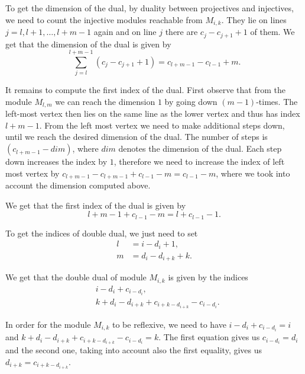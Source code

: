 \documentclass[12pt, a4paper]{article}
\numberwithin{equation}{section}
\theoremstyle{definition}
\theoremstyle{plain}
\theoremstyle{remark}
\begin{document}
To get the dimension of the dual, by duality between projectives and injectives, we need to count the injective modules reachable from $M_{i,k}$.
They lie on lines $j = l, l+1, \dots, l+m-1$ again and on line $j$ there are $c_j - c_{j+1} + 1$ of them.
We get that the dimension of the dual is given by
\begin{equation}
\label{eq:injectives}      
\sum_{j=l}^{l+m-1} (c_j - c_{j+1} + 1) = c_{l+m-1} - c_{l-1} + m.
\end{equation}

It remains to compute the first index of the dual.
First observe that from the module $M_{l,m}$ we can reach the dimension $1$ by going down $(m - 1)$-times. The left-most vertex then lies on the same line as the lower vertex and thus has index $l + m - 1$.
From the left most vertex we need to make additional steps down, until we reach the desired dimension of the dual.
The number of steps is $(c_{l+m-1} - dim)$, where $dim$ denotes the dimension of the dual.
Each step down increases the index by $1$, therefore we need to increase the index of left most vertex by $c_{l+m-1} - c_{l+m-1} + c_{l-1} - m = c_{l-1} - m$, where we took into account the dimension computed above.

We get that the first index of the dual is given by 
$$l + m - 1 + c_{l-1} - m = l + c_{l-1} - 1.$$

To get the indices of double dual, we just need to set 
\begin{align*}
    l &= i - d_i + 1, \\
    m &= d_i - d_{i+k} + k.
\end{align*}

We get that the double dual of module $M_{i,k}$ is given by the indices
\begin{align*}
    &i - d_i + c_{i - d_i}, \\
    &k + d_i - d_{i+k} + c_{i+k-{d_{i+k}}} - c_{i-d_i}.
\end{align*}

In order for the module $M_{i,k}$ to be reflexive, we need to have $i - d_i + c_{i - d_i} = i$ and $k + d_i - d_{i+k} + c_{i+k-{d_{i+k}}} - c_{i-d_i} = k$.
The first equation gives us $c_{i - d_i} = d_i$ and the second one, taking into account also the first equality, gives us $d_{i+k} = c_{i+k-{d_{i+k}}}$.



 

\end{document}
